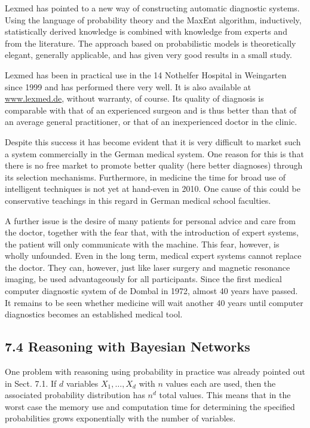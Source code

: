 \documentclass[10pt]{article}
\begin{document}
Lexmed has pointed to a new way of constructing automatic diagnostic systems. Using the language of probability theory and the MaxEnt algorithm, inductively,\\
statistically derived knowledge is combined with knowledge from experts and from the literature. The approach based on probabilistic models is theoretically elegant, generally applicable, and has given very good results in a small study.

Lexmed has been in practical use in the 14 Nothelfer Hospital in Weingarten since 1999 and has performed there very well. It is also available at \href{http://www.lexmed.de}{www.lexmed.de}, without warranty, of course. Its quality of diagnosis is comparable with that of an experienced surgeon and is thus better than that of an average general practitioner, or that of an inexperienced doctor in the clinic.

Despite this success it has become evident that it is very difficult to market such a system commercially in the German medical system. One reason for this is that there is no free market to promote better quality (here better diagnoses) through its selection mechanisms. Furthermore, in medicine the time for broad use of intelligent techniques is not yet at hand-even in 2010. One cause of this could be conservative teachings in this regard in German medical school faculties.

A further issue is the desire of many patients for personal advice and care from the doctor, together with the fear that, with the introduction of expert systems, the patient will only communicate with the machine. This fear, however, is wholly unfounded. Even in the long term, medical expert systems cannot replace the doctor. They can, however, just like laser surgery and magnetic resonance imaging, be used advantageously for all participants. Since the first medical computer diagnostic system of de Dombal in 1972, almost 40 years have passed. It remains to be seen whether medicine will wait another 40 years until computer diagnostics becomes an established medical tool.

\subsection*{7.4 Reasoning with Bayesian Networks}
One problem with reasoning using probability in practice was already pointed out in Sect. 7.1. If $d$ variables $X_{1}, \ldots, X_{d}$ with $n$ values each are used, then the associated probability distribution has $n^{d}$ total values. This means that in the worst case the memory use and computation time for determining the specified probabilities grows exponentially with the number of variables.
\end{document}
